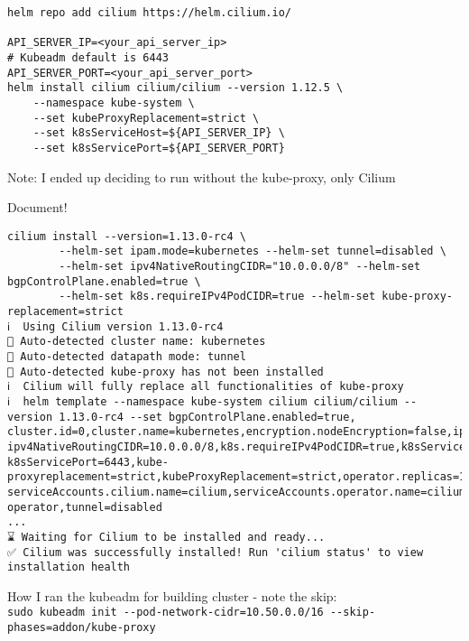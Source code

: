 \documentclass[Screen16to9,17pt]{foils}
\begin{document}
\begin{verbatim}
helm repo add cilium https://helm.cilium.io/

API_SERVER_IP=<your_api_server_ip>
# Kubeadm default is 6443
API_SERVER_PORT=<your_api_server_port>
helm install cilium cilium/cilium --version 1.12.5 \
    --namespace kube-system \
    --set kubeProxyReplacement=strict \
    --set k8sServiceHost=${API_SERVER_IP} \
    --set k8sServicePort=${API_SERVER_PORT}
\end{verbatim}

\begin{list2}
\item Note: I ended up deciding to run without the kube-proxy, only Cilium
\item Document!
\end{list2}




\begin{verbatim}
cilium install --version=1.13.0-rc4 \
		--helm-set ipam.mode=kubernetes --helm-set tunnel=disabled \
		--helm-set ipv4NativeRoutingCIDR="10.0.0.0/8" --helm-set bgpControlPlane.enabled=true \
		--helm-set k8s.requireIPv4PodCIDR=true --helm-set kube-proxy-replacement=strict
ℹ️  Using Cilium version 1.13.0-rc4
🔮 Auto-detected cluster name: kubernetes
🔮 Auto-detected datapath mode: tunnel
🔮 Auto-detected kube-proxy has not been installed
ℹ️  Cilium will fully replace all functionalities of kube-proxy
ℹ️  helm template --namespace kube-system cilium cilium/cilium --version 1.13.0-rc4 --set bgpControlPlane.enabled=true,
cluster.id=0,cluster.name=kubernetes,encryption.nodeEncryption=false,ipam.mode=kubernetes,
ipv4NativeRoutingCIDR=10.0.0.0/8,k8s.requireIPv4PodCIDR=true,k8sServiceHost=10.137.0.26,
k8sServicePort=6443,kube-proxyreplacement=strict,kubeProxyReplacement=strict,operator.replicas=1,
serviceAccounts.cilium.name=cilium,serviceAccounts.operator.name=cilium-operator,tunnel=disabled
...
⌛ Waiting for Cilium to be installed and ready...
✅ Cilium was successfully installed! Run 'cilium status' to view installation health
\end{verbatim}


How I ran the kubeadm for building cluster - note the skip:\\
\verb+sudo kubeadm init --pod-network-cidr=10.50.0.0/16 --skip-phases=addon/kube-proxy+

\slide{After install Cilium}
\end{document}
